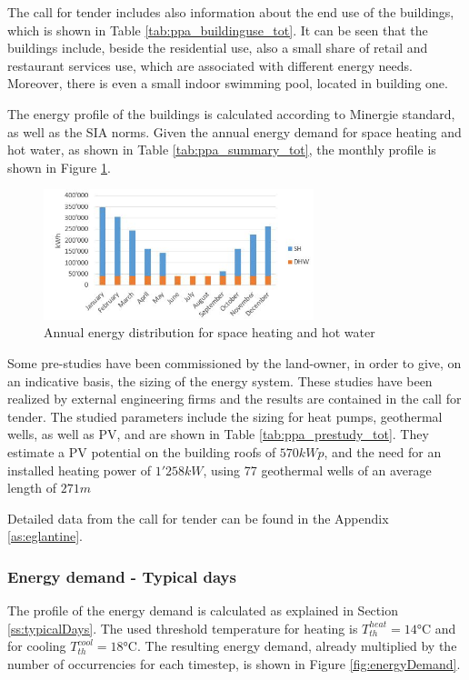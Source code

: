 \documentclass{article}
\begin{document}
The call for tender includes also information about the end use of the buildings, which is shown in Table \ref{tab:ppa_buildinguse_tot}. It can be seen that the buildings include, beside the residential use, also a small share of retail and restaurant services use, which are associated with different energy needs. Moreover, there is even a small indoor swimming pool, located in building one. 



The energy profile of the buildings is calculated according to Minergie standard, as well as the SIA norms. Given the annual energy demand for space heating and hot water, as shown in Table \ref{tab:ppa_summary_tot}, the monthly profile is shown in Figure \ref{fig:ppa_energydemand}.

\begin{figure}[htp]
\centering
\includegraphics[width=0.7\textwidth]{ppa_energydemand.JPG}
\caption{Annual energy distribution for space heating and hot water}
\label{fig:ppa_energydemand}
\end{figure}

Some pre-studies have been commissioned by the land-owner, in order to give, on an indicative basis, the sizing of the energy system. These studies have been realized by external engineering firms and the results are contained in the call for tender. The studied parameters include the sizing for heat pumps, geothermal wells, as well as PV, and are shown in Table \ref{tab:ppa_prestudy_tot}. They estimate a PV potential on the building roofs of $570 kWp$, and the need for an installed heating power of $1'258 kW$, using 77 geothermal wells of an average length of $271 m$



Detailed data from the call for tender can be found in the Appendix \ref{as:eglantine}.

\subsubsection{Energy demand - Typical days}
The profile of the energy demand is calculated as explained in Section \ref{ss:typicalDays}. The used threshold temperature for heating is $T_{th}^{heat} = 14\si{\celsius}$ and for cooling $T_{th}^{cool} = 18 \si{\celsius}$. The resulting energy demand, already multiplied by the number of occurrencies for each timestep, is shown in Figure \ref{fig:energyDemand}.
\end{document}
